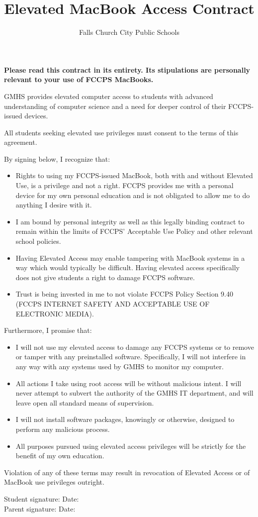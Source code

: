 \documentclass{article}
\title{Elevated MacBook Access Contract}
\author{Falls Church City Public Schools}
\begin{document}
\maketitle
\noindent\textbf{Please read this contract in its entirety. Its stipulations are personally relevant to your use of FCCPS MacBooks.}

GMHS provides elevated computer access to students with advanced understanding of computer science and a need for deeper control of their FCCPS-issued devices.

All students seeking elevated use privileges must consent to the terms of this agreement.

By signing below, I recognize that:
\begin{itemize}
\item{Rights to using my FCCPS-issued MacBook, both with and without Elevated Use, is a privilege and not a right. FCCPS provides me with a personal device for my own personal education and is not obligated to allow me to do anything I desire with it.}
\item{I am bound by personal integrity as well as this legally binding contract to remain within the limits of FCCPS’ Acceptable Use Policy and other relevant school policies.}
\item{Having Elevated Access may enable tampering with MacBook systems in a way which would typically be difficult. Having elevated access specifically does not give students a right to damage FCCPS software.}
\item{Trust is being invested in me to not violate FCCPS Policy Section 9.40 (FCCPS INTERNET SAFETY AND ACCEPTABLE USE OF ELECTRONIC MEDIA).}
\end{itemize}

Furthermore, I promise that:
\begin{itemize}
\item{I will not use my elevated access to damage any FCCPS systems or to remove or tamper with any preinstalled software. Specifically, I will not interfere in any way with any systems used by GMHS to monitor my computer.}
\item{All actions I take using root access will be without malicious intent. I will never attempt to subvert the authority of the GMHS IT department, and will leave open all standard means of supervision.}
\item{I will not install software packages, knowingly or otherwise, designed to perform any malicious process.}
\item{All purposes pursued using elevated access privileges will be strictly for the benefit of my own education.}
\end{itemize}

Violation of any of these terms may result in revocation of Elevated Access or of MacBook use privileges outright.

\vspace{1cm}
\noindent
Student signature: \underline{\hspace{3cm}} Date: \underline{\hspace{2cm}}\\
\noindent
Parent signature:  \underline{\hspace{3cm}} Date: \underline{\hspace{2cm}}
\end{document}
